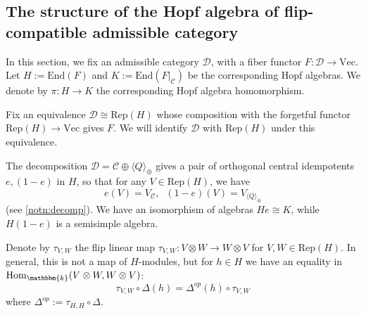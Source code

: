 \documentclass{amsart}
\theoremstyle{plain}%
\theoremstyle{remark}
\newcommand{\C}{\mathcal{C}}
\newcommand{\1}{\mathbbm{1}}
\newcommand{\D}{\mathcal{D}}
\newcommand{\End}{\mathrm{End}}
\newcommand{\Rep}{\mathrm{Rep}}
\newcommand{\Vect}{\mathrm{Vec}}
\newcommand{\Hom}{\mathrm{Hom}}
\newcommand{\kk}{\mathbbm{k}}
\begin{document}
    \subsection{The structure of the Hopf algebra of flip-compatible admissible category}
        In this section, we fix an admissible category $\D$, with a fiber functor $F:\D\to \Vect $. Let $H := \End(F)$ and $K:=\End(F|_\C)$ be the corresponding Hopf algebras. We denote by $\pi:H\to K$ the corresponding Hopf algebra homomorphism.

        Fix an equivalence $\D\cong\Rep(H)$ whose composition with the forgetful functor $\Rep(H)\to \Vect$ gives $F$. We will identify $\D$ with $\Rep(H)$ under this equivalence.

        The decomposition $\D=\C\oplus {\langle Q\rangle_{\oplus}}$ gives a pair of orthogonal central idempotents $e,(1-e)$ in $H$, so that for any $V\in \Rep(H)$, we have $$e(V)=V_{\C},\;\; (1-e)(V)=V_{\langle Q\rangle_{\oplus}}$$ (see \cref{notn:decomp}). 
        We have an isomorphism of algebras $He\cong K$, while $H(1-e)$ is a semisimple algebra. 
        
        Denote by $\tau_{V,W}$ the flip linear map $\tau_{V,W}:V\otimes W\to W\otimes V$ for $V,W\in \Rep(H)$. In general, this is not a map of $H$-modules, but for $h\in H$ we have an equality in $\Hom_{\kk}(V\otimes W, W\otimes V)$:
        \begin{equation}\label{eq: flip-compatability}
            \tau_{V,W}\circ \Delta(h)  = \Delta^{op}(h)\circ \tau_{V,W}
        \end{equation}
        where $ \Delta^{op}:=\tau_{H, H}\circ \Delta$.
\end{document}
